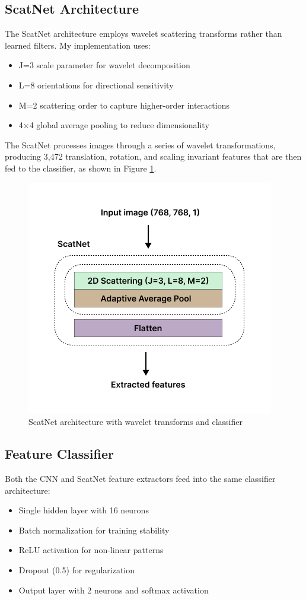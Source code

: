 \documentclass[10pt,twocolumn]{article}
\begin{document}
\subsection{ScatNet Architecture}
The ScatNet architecture employs wavelet scattering transforms rather than learned filters. My implementation uses:
\begin{itemize}
    \item J=3 scale parameter for wavelet decomposition
    \item L=8 orientations for directional sensitivity
    \item M=2 scattering order to capture higher-order interactions
    \item 4×4 global average pooling to reduce dimensionality
\end{itemize}

The ScatNet processes images through a series of wavelet transformations, producing 3,472 translation, rotation, and scaling invariant features that are then fed to the classifier, as shown in Figure \ref{fig:scatnet_arch}.

\begin{figure}[h]
\centering
\includegraphics[width=0.9\columnwidth]{imgs/scatnet_arch.png}
\caption{ScatNet architecture with wavelet transforms and classifier}
\label{fig:scatnet_arch}
\end{figure}

\subsection{Feature Classifier}
Both the CNN and ScatNet feature extractors feed into the same classifier architecture:
\begin{itemize}
    \item Single hidden layer with 16 neurons
    \item Batch normalization for training stability
    \item ReLU activation for non-linear patterns
    \item Dropout (0.5) for regularization
    \item Output layer with 2 neurons and softmax activation
\end{itemize}
\end{document}
